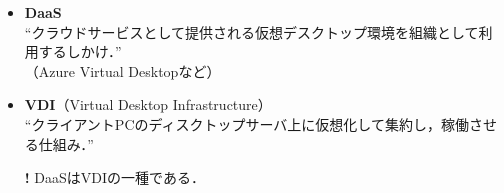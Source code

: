 \begin{frame}[t]{\fftitle}
    \begin{itemize}
        \item \textbf{DaaS}\\
              ``クラウドサービスとして提供される仮想デスクトップ環境を組織として利用するしかけ．''\hfill\cite{ISディジタル辞典DaaS}\\
              （Azure Virtual Desktopなど）\\
              \hrulefill
        \item \textbf{VDI}（Virtual Desktop Infrastructure）\\
              ``クライアントPCのディスクトップサーバ上に仮想化して集約し，稼働させる仕組み．''\hfill\cite{ISディジタル辞典VDI}
              \item[\textbf{\large !}]DaaSはVDIの一種である．
    \end{itemize}
\end{frame}